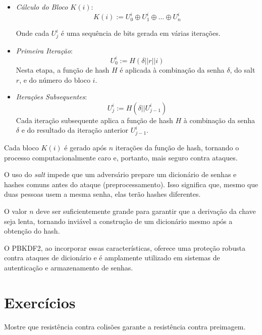 \begin{itemize}
    \item[] {\em Cálculo do Bloco $K(i)$}:
    \begin{displaymath}
    K(i) := U_0^i \oplus U_1^i \oplus \dots \oplus U_n^i
    \end{displaymath}
    
    Onde cada $U_j^i$ é uma sequência de bits gerada em várias iterações.

    \item[] {\em Primeira Iteração}:
    \begin{displaymath}
    U_0^i := H(\delta || r || i)
    \end{displaymath}
    Nesta etapa, a função de hash $H$ é aplicada à combinação da senha $\delta$, do salt $r$, e do número do bloco $i$.

    \item[] {\em Iterações Subsequentes}:
    \begin{displaymath}
    U_j^i := H(\delta || U_{j-1}^i)
    \end{displaymath}
    Cada iteração subsequente aplica a função de hash $H$ à combinação da senha $\delta$ e do resultado da iteração anterior $U_{j-1}^i$.
\end{itemize}

Cada bloco $K(i)$ é gerado após $n$ iterações da função de hash, tornando o processo computacionalmente caro e, portanto, mais seguro contra ataques.

O uso do {\em salt} impede que um adversário prepare um dicionário de senhas e hashes comuns antes do ataque (preprocessamento).
Isso significa que, mesmo que duas pessoas usem a mesma senha, elas terão hashes diferentes.

O valor $n$ deve ser suficientemente grande para garantir que a derivação da chave seja lenta, tornando inviável a construção de um dicionário mesmo após a obtenção do hash.

O PBKDF2, ao incorporar essas características, oferece uma proteção robusta contra ataques de dicionário e é amplamente utilizado em sistemas de autenticação e armazenamento de senhas.

\section{Exercícios}
\label{sec:exercicios}

\begin{exercicio}
  Mostre que resistência contra colisões garante a resistência contra preimagem.
\end{exercicio}

